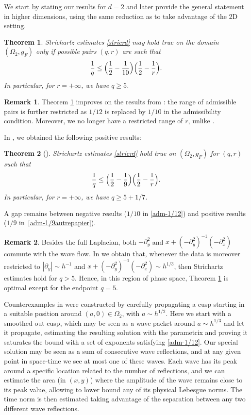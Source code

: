 \documentclass[11pt]{article}
\theoremstyle{plain}
\newtheorem{thm}{Theorem}
\theoremstyle{definition}
\newtheorem{rmq}{Remark}[section]
\begin{document}
We start by stating our results for $d=2$ and later provide the general statement in higher dimensions, using the same reduction as \cite{doi2} to take advantage of the 2D setting.
\begin{thm}
\label{thm-1}
Strichartz estimates \eqref{stricrd} may hold true on the domain $(\Omega_{2},g_{F})$ only if possible pairs $(q,r)$ are
such that
\begin{equation}\label{adm-1/12}
\frac 1q\leq \Bigl(\frac{1} 2 -\frac 1 {10}\Bigr)\Bigl(\frac{1}{2}-\frac{1}{r}\Bigr).
\end{equation}
In particular, for $r=+\infty$, we have $q\geq 5$.
\end{thm}
\begin{rmq} Theorem \ref{thm-1} improves on the results from
\cite{doi}: the range of admissible pairs is further restricted as $1/12$ is replaced by $1/10$ in the admissibility condition. Moreover, we no longer have a restricted range of $r$, unlike \cite{doi}.
\end{rmq}
In \cite{ILP3}, we obtained the following positive results:
\begin{thm}[\cite{ILP3}]
Strichartz estimates \eqref{stricrd} hold true on $(\Omega_{2},g_{F})$ for $(q,r)$ such that
\begin{equation}\label{adm-1/9autrepapier}
\frac 1q\leq \Bigl(\frac{1} 2 -\frac 1 {9}\Bigr)\Bigl(\frac{1}{2}-\frac{1}{r}\Bigr).
\end{equation}
In particular, for $r=+\infty$, we have $q\geq 5+1/7$.
\end{thm}
A gap remains between negative results ($1/10$ in \eqref{adm-1/12}) and positive results ($1/9$ in~\eqref{adm-1/9autrepapier}).
\begin{rmq} Besides the full Laplacian, both $-\partial_{y}^{2}$ and $x+(-\partial^{2}_{y})^{-1}(-\partial_{x}^{2})$ commute with the wave flow. In \cite{ILP3} we obtain that, whenever the data is moreover restricted to $|\partial_{y}|\sim h^{-1}$ and $x+(-\partial^{2}_{y})^{-1}(-\partial_{x}^{2})\sim h^{1/3}$, then Strichartz estimates hold for $q>5$. Hence, in this region of phase space, Theorem \ref{thm-1} is optimal except for the endpoint $q=5$.
\end{rmq}
Counterexamples in \cite{doi} were constructed by carefully
propagating a cusp starting in a suitable position around $(a,0)\in \Omega_{2}$, with $a\sim
h^{1/2}$. Here we start with a smoothed out cusp, which may be seen as a wave packet around $a\sim h^{1/3}$
and let it propagate, estimating the resulting solution with the
parametrix and proving it saturates the bound with a set of exponents satisfying \eqref{adm-1/12}. Our special solution may be seen as a sum of consecutive wave reflections, and at any given point in space-time we see at most one of these waves. Each wave has its peak around a specific location related to the number of reflections, and we can estimate the area (in $(x,y)$) where the amplitude of the wave remains close to its peak value, allowing to lower bound any of its physical Lebesgue norms. The time norm is then estimated taking advantage of the separation between any two different wave reflections.
\end{document}
